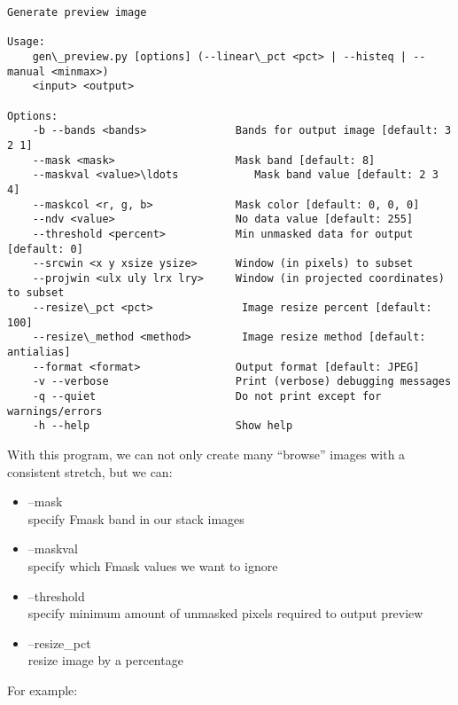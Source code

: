 \documentclass{article}
\begin{document}
    \begin{Verbatim}[commandchars=\\\{\}]
Generate preview image

Usage:
    gen\_preview.py [options] (--linear\_pct <pct> | --histeq | --manual <minmax>) 
	<input> <output>

Options:
    -b --bands <bands>              Bands for output image [default: 3 2 1]
    --mask <mask>                   Mask band [default: 8]
    --maskval <value>\ldots            Mask band value [default: 2 3 4]
    --maskcol <r, g, b>             Mask color [default: 0, 0, 0]
    --ndv <value>                   No data value [default: 255]
    --threshold <percent>           Min unmasked data for output [default: 0]
    --srcwin <x y xsize ysize>      Window (in pixels) to subset
    --projwin <ulx uly lrx lry>     Window (in projected coordinates) to subset
    --resize\_pct <pct>              Image resize percent [default: 100]
    --resize\_method <method>        Image resize method [default: antialias]
    --format <format>               Output format [default: JPEG]
    -v --verbose                    Print (verbose) debugging messages
    -q --quiet                      Do not print except for warnings/errors
    -h --help                       Show help
    \end{Verbatim}

    With this program, we can not only create many ``browse'' images with a
consistent stretch, but we can:

\begin{itemize}
\itemsep1pt\parskip0pt
\item
  --mask\\ specify Fmask band in our stack images
\item
  --maskval\\ specify which Fmask values we want to ignore
\item
  --threshold\\ specify minimum amount of unmasked pixels required to
  output preview
\item
  --resize\_pct\\ resize image by a percentage
\end{itemize}

For example:
\end{document}
